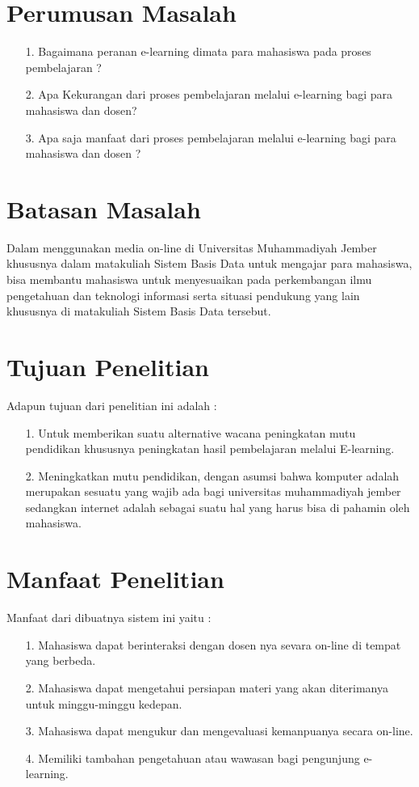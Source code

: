 \documentclass{jtetiproposalskripsi}
\begin{document}
\section{Perumusan Masalah}
\begin{itemize}
\item[1.]Bagaimana peranan e-learning dimata para mahasiswa pada proses pembelajaran ?
\item[2.]Apa Kekurangan dari proses pembelajaran melalui e-learning bagi para mahasiswa dan dosen?
\item[3.]Apa saja manfaat dari proses pembelajaran melalui e-learning bagi para mahasiswa dan dosen ?
\end{itemize}

\section{Batasan Masalah}
Dalam menggunakan media on-line di Universitas Muhammadiyah Jember khususnya dalam matakuliah Sistem Basis Data untuk mengajar para mahasiswa, bisa membantu mahasiswa untuk menyesuaikan pada perkembangan ilmu pengetahuan dan teknologi informasi serta situasi pendukung yang lain khususnya di matakuliah Sistem Basis Data tersebut.


\section{Tujuan Penelitian}
Adapun tujuan dari penelitian ini adalah :
\begin{itemize}
\item[1.]Untuk memberikan suatu alternative wacana peningkatan mutu pendidikan khususnya peningkatan hasil pembelajaran melalui E-learning.
\item[2.]Meningkatkan mutu pendidikan, dengan asumsi bahwa komputer adalah merupakan sesuatu yang wajib ada bagi universitas muhammadiyah jember sedangkan internet adalah sebagai suatu hal yang harus bisa di pahamin oleh mahasiswa.
\end{itemize}


\section{Manfaat Penelitian}
Manfaat dari dibuatnya sistem ini yaitu :
\begin{itemize}
\item[1.]Mahasiswa dapat berinteraksi dengan dosen nya sevara on-line di tempat yang berbeda.
\item[2.]Mahasiswa dapat mengetahui persiapan materi yang akan diterimanya untuk minggu-minggu kedepan.
\item[3.]Mahasiswa dapat mengukur dan mengevaluasi kemanpuanya secara on-line.
\item[4.]Memiliki tambahan pengetahuan atau wawasan bagi pengunjung e-learning.
\end{itemize}
\end{document}
